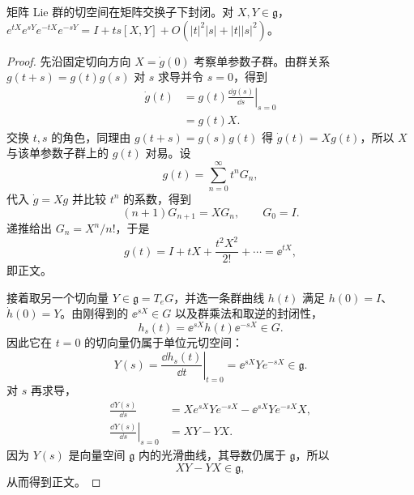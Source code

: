 \begin{proposition}
矩阵 Lie 群的切空间在矩阵交换子下封闭。对 $X,Y\in\mathfrak g$，$e^{tX}e^{sY}e^{-tX}e^{-sY}=I+ts[X,Y]+O(|t|^2|s|+|t||s|^2)$。
\end{proposition}
\begin{proof}
先沿固定切向方向 $X=\dot g(0)$ 考察单参数子群。由群关系 $g(t+s)=g(t)g(s)$ 对 $s$ 求导并令 $s=0$，得到
\begin{align*}
 \dot g(t)
 &=g(t)\left.\frac{\dd g(s)}{\dd s}\right|_{s=0}\\
 &=g(t)X.
\end{align*}
交换 $t,s$ 的角色，同理由 $g(t+s)=g(s)g(t)$ 得 $\dot g(t)=Xg(t)$，所以 $X$ 与该单参数子群上的 $g(t)$ 对易。设
\begin{equation*}
 g(t)=\sum_{n=0}^{\infty}t^nG_n,
\end{equation*}
代入 $\dot g=Xg$ 并比较 $t^n$ 的系数，得到
\begin{equation*}
 (n+1)G_{n+1}=XG_n,\qquad G_0=I.
\end{equation*}
递推给出 $G_n=X^n/n!$，于是
\begin{equation*}
 g(t)=I+tX+\frac{t^2X^2}{2!}+\cdots=\ee^{tX},
\end{equation*}
即正文。

接着取另一个切向量 $Y\in\mathfrak g=T_eG$，并选一条群曲线 $h(t)$ 满足 $h(0)=I$、$\dot h(0)=Y$。由刚得到的 $\ee^{sX}\in G$ 以及群乘法和取逆的封闭性，
\begin{equation*}
 h_s(t)=\ee^{sX}h(t)\ee^{-sX}\in G.
\end{equation*}
因此它在 $t=0$ 的切向量仍属于单位元切空间：
\begin{equation*}
 Y(s)=\left.\frac{\dd h_s(t)}{\dd t}\right|_{t=0}
 =\ee^{sX}Ye^{-sX}\in\mathfrak g.
\end{equation*}
对 $s$ 再求导，
\begin{align*}
 \frac{\dd Y(s)}{\dd s}
 &=Xe^{sX}Ye^{-sX}-\ee^{sX}Ye^{-sX}X,\\
 \left.\frac{\dd Y(s)}{\dd s}\right|_{s=0}
 &=XY-YX.
\end{align*}
因为 $Y(s)$ 是向量空间 $\mathfrak g$ 内的光滑曲线，其导数仍属于 $\mathfrak g$，所以
\begin{equation*}
 XY-YX\in\mathfrak g,
\end{equation*}
从而得到正文。
\end{proof}

